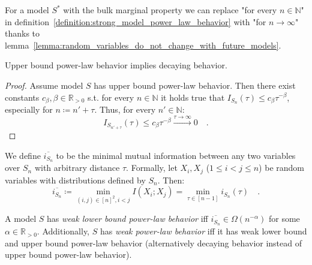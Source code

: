 \documentclass[../../main.tex]{subfiles}
\begin{document}
    \begin{remark}
        For a model $S^*$ with the bulk marginal property we can replace "for every $n \in \mathbb{N}$" in definition~\ref{definition:strong_model_power_law_behavior} with "for $n \to \infty$" thanks to lemma~\ref{lemma:random_variables_do_not_change_with_future_models}.
    \end{remark}

    \begin{proposition}
        Upper bound power-law behavior implies decaying behavior.
    \end{proposition}
    \vspace{-2.5em}
    \begin{proof}
        Assume model $S$ has upper bound power-law behavior. Then there exist constants $c_\beta, \beta \in \mathbb{R}_{>0}$ s.t. for every $n \in \mathbb{N}$ it holds true that $I_{S_n}(\tau) \leq c_\beta \tau^{-\beta}$, especially for $n \coloneqq n' + \tau$. Thus, for every $n' \in \mathbb{N}$:
        \[
            I_{S_{n' + \tau}}(\tau) \leq c_\beta \tau^{-\beta} \xrightarrow{\tau \to \infty} 0 \quad .
        \]
    \end{proof}

    \begin{definition}
        We define $\overline{i_{S_n}}$ to be the minimal mutual information between any two variables over $S_n$ with arbitrary distance $\tau$. Formally, let $X_i, X_j$ ($1 \leq i < j \leq n$) be random variables with distributions defined by $S_n$. Then:
        \[
            \overline{i_{S_n}} \coloneqq \min_{(i, j) \in [n]^2, i < j} I(X_i; X_j) = \min_{\tau \in [n - 1]} i_{S_n}(\tau) \quad .
        \]
    \end{definition}

    \begin{definition}
        \label{definition:weak_power_law_behavior}
        A model $S$ has \emph{weak lower bound power-law behavior} iff $\overline{i_{S_n}} \in \Omega(n^{-\alpha})$ for some $\alpha \in \mathbb{R}_{>0}$. Additionally, $S$ has \emph{weak power-law behavior} iff it has weak lower bound and upper bound power-law behavior (alternatively decaying behavior instead of upper bound power-law behavior).
    \end{definition}
\end{document}
